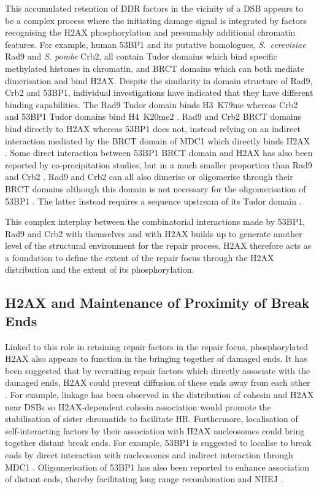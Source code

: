 \documentclass[graybox]{svmult}
\begin{document}
This accumulated retention of DDR factors in the vicinity of a DSB appears to be a complex process
where the initiating damage signal is integrated by factors recognising the H2AX phosphorylation and
presumably additional chromatin features. For example, human 53BP1 and its putative homologues,
\emph{S.\ cerevisiae} Rad9 and \emph{S. pombe} Crb2, all contain Tudor domains which bind specific
methylated histones in chromatin, and BRCT domains which can both mediate dimerisation and bind
\ugamma H2AX\@. Despite the similarity in domain structure of Rad9, Crb2 and 53BP1, individual
investigations have indicated that they have different binding capabilities. The Rad9 Tudor domain
binds H3~K79me \cite{GCJ+07,HZDJ+04} whereas Crb2 and 53BP1 Tudor domains bind H4~K20me2 \cite{SPM+04,BLW+06}.
Rad9 and Crb2 BRCT domains bind directly to \ugamma H2AX \cite{HMH+07,KDR+08} whereas 53BP1 does not,
instead relying on an indirect interaction mediated by the BRCT domain of MDC1 which directly binds
\ugamma H2AX \cite{MSL+05,MSJAC+05}. Some direct interaction between 53BP1 BRCT domain and \ugamma H2AX
has also been reported by co-precipitation studies, but in a much smaller proportion than Rad9 and
Crb2 \cite{KDR+08}. Rad9 and Crb2 can all also dimerise or oligomerise through their BRCT domains \cite{SL99,DMR04}
although this domain is not necessary for the oligomerisation of 53BP1 \cite{AWX+05}. The latter
instead requires a sequence upstream of its Tudor domain \cite{WKM+06}.

This complex interplay between the combinatorial interactions made by 53BP1, Rad9 and Crb2 with
themselves and with \ugamma H2AX builds up to generate another level of the structural environment
for the repair process. \ugamma H2AX therefore acts as a foundation to define the extent of the
repair focus through the H2AX distribution and the extent of its phosphorylation.

\subsection{\ugamma H2AX and Maintenance of Proximity of Break Ends}
\label{subsec:H2AX-break-ends}
Linked to this role in retaining repair factors in the repair focus, phosphorylated H2AX also appears
to function in the bringing together of damaged ends. It has been suggested that by recruiting repair
factors which directly associate with the damaged ends, H2AX could prevent diffusion of these ends
away from each other \cite{BA04}. For example, linkage has been observed in the distribution of
cohesin and \ugamma H2AX near DSBs \cite{UAS+04} so \ugamma H2AX-dependent cohesin association would
promote the stabilisation of sister chromatids to facilitate HR\@. Furthermore, localisation of
self-interacting factors by their association with \ugamma H2AX nucleosomes could bring together
distant break ends. For example, 53BP1 is suggested to localise to break ends by direct interaction
with nucleosomes and indirect interaction through MDC1 \cite{HZDJ+04,BLW+06,EAR+09}. Oligomerisation
of 53BP1 has also been reported to enhance association of distant ends, thereby facilitating long
range recombination and NHEJ \cite{DGW+08,DCS+08}.
\end{document}
